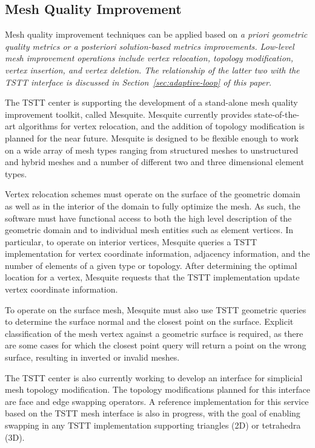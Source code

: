 \subsection{Mesh Quality Improvement}\label{sec:quality-improvement}

Mesh quality improvement techniques can be applied based on \em{a
priori} geometric quality metrics or \em{a posteriori} solution-based
metrics improvements.  Low-level mesh improvement operations include
vertex relocation, topology modification, vertex insertion, and vertex
deletion.  The relationship of the latter two with the TSTT interface is
discussed in Section~\ref{sec:adaptive-loop} of this paper.

The TSTT center is supporting the development of a stand-alone mesh
quality improvement toolkit, called Mesquite.  Mesquite currently
provides state-of-the-art algorithms for vertex relocation, and the
addition of topology modification is planned for the near future.
Mesquite is designed to be flexible enough to work on a wide array of
mesh types ranging from structured meshes to unstructured and hybrid
meshes and a number of different two and three dimensional element
types.


Vertex relocation schemes must operate on the surface of the geometric
domain as well as in the interior of the domain to fully optimize the
mesh.  As such, the software must have functional access to both the
high level description of the geometric domain and to individual mesh
entities such as element vertices.  In particular, to operate on
interior vertices, Mesquite queries a TSTT implementation for vertex
coordinate information, adjacency information, and the number of
elements of a given type or topology.  After determining the optimal
location for a vertex, Mesquite requests that the TSTT implementation
update vertex coordinate information.

To operate on the surface mesh, Mesquite must also use TSTT geometric
queries to determine the surface normal and the closest point on the
surface.  Explicit classification of the mesh vertex against a geometric
surface is required, as there are some cases for which the closest point
query will return a point on the wrong surface, resulting in inverted or
invalid meshes.

The TSTT center is also currently working to develop an interface for
simplicial mesh topology modification.  The topology modifications
planned for this interface are face and edge swapping operators.  A
reference implementation for this service based on the TSTT mesh
interface is also in progress, with the goal of enabling swapping in any
TSTT implementation supporting triangles (2D) or tetrahedra (3D).  

